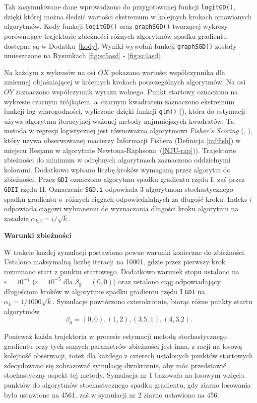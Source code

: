 Tak zasymulowane dane wprowadzono do przygotowanej funkcji \texttt{logitGD()}, dzięki której można śledzić wartości ekstremum w kolejnych krokach omawianych algorytmów. Kody funkcji \texttt{logitGD()} oraz \texttt{graphSGD()} tworzącej wykresy porównujące trajektorie zbieżności różnych algorytmów spadku gradientu  dostępne są w Dodatku~\ref{kody}. Wyniki wywołań funkcji \texttt{graphSGD()} zostały umieszczone na Rysunkach \ref{fig:sc5asd} - \ref{fig:sc4asd}.

Na każdym z wykresów na osi $OX$ pokazano wartości współczynnika dla zmiennej objaśniającej w kolejnych krokach poszczególnych algorytmów. Na osi $OY$ zaznaczono współczynnik wyrazu wolnego. Punkt startowy oznaczono na wykresie czarnym trójkątem, a~czarnym kwadratem zaznaczono ekstremum funkcji log-wiarogodności, wyliczone dzięki funkcji \texttt{glm()} (\cite{glmglm}), która do estymacji używa algorytmu iteracyjnej ważonej metody najmniejszych kwadratów. Ta metoda w regresji logistycznej jest równoważna algorytmowi \textit{Fisher's Scoring} (\cite{scoring1}, \cite{scoring2}), który używa obserwowanej macierzy Informacji Fishera (Definicja \ref{inf:fish}) w miejscu Hesjanu w algorytmie Newtona-Raphsona~(\ref{NJU-rap})). Trajektorie zbieżności do minimum w odrębnych algorytmach zaznaczono oddzielnymi kolorami. Dodatkowo wpisano liczbę kroków wymaganą przez algorytm do zbieżności. Przez \texttt{GDI} oznaczono algorytmu spadku gradientu rzędu I, zaś przez \texttt{GDII} rzędu II. Oznaczenie \texttt{SGD.i} odpowiada 3 algorytmom stochastycznego spadku gradientu o~różnych ciągach odpowiedzialnych za długość kroku. Indeks $i$ odpowiada ciągowi wybranemu do wyznaczania długości kroku algorytmu na zasadzie $\alpha_{k,i} = i/\sqrt{k}$.

\textbf{Warunki zbieżności}

W trakcie każdej symulacji postawiono pewne warunki konieczne do zbieżności. Ustalono maksymalną liczbę iteracji na 10001, gdzie przez pierwszy krok rozumiano start z punktu startowego. Dodatkowo warunek stopu ustalono na $\varepsilon=10^{-4}$ ($\varepsilon=10^{-5}$ dla $\beta_0 = (0,0)$) oraz ustalono ciąg odpowiadający długościom kroków w algorytmie spadku gradientu rzędu I \texttt{GDI} na $\alpha_{k} = 1/1000\sqrt{k}$. Symulacje powtórzono czterokrotnie, biorąc różne punkty startu algorytmów $$\beta_0 = (0,0), (1,2), (3.5,1), (4,3.2).$$

Ponieważ każda trajektoria w procesie estymacji metodą stochastycznego gradientu przy tych samych parametrów zbieżności jest inna, z racji na losową kolejność obserwacji, toteż dla każdego z czterech ustalonych punktów startowych zdecydowano się zobrazować symulację dwukrotnie, aby móc przedstawić stochastyczny aspekt tej metody. Symulacja nr 1 bazowała na losowym wzięciu punktów do algorytmów stochastycznego spadku gradientu, gdy ziarno losowania było ustawione na 4561, zaś w symulacji nr 2 ziarno ustawiono na 456.

